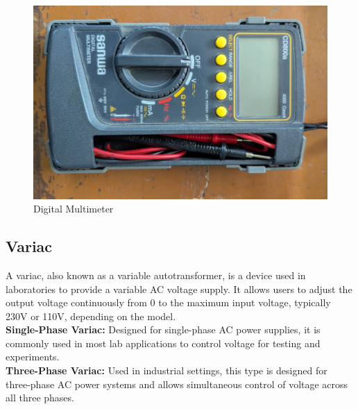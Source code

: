 \documentclass[a4paper,12pt]{article}
\begin{document}
	
	
\begin{figure}[H]
	\centering
	\includegraphics[angle=270,width=0.5\linewidth]{Images/4}
	\caption{Digital Multimeter}
	\label{fig:4}
\end{figure}
	
\subsection{Variac}
A variac, also known as a variable autotransformer, is a device used in laboratories to provide a variable AC voltage supply. It allows users to adjust the output voltage continuously from 0 to the maximum input voltage, typically 230V or 110V, depending on the model.\\
\textbf{Single-Phase Variac:} Designed for single-phase AC power supplies, it is commonly used in most lab applications to control voltage for testing and experiments.\\
\textbf{Three-Phase Variac:} Used in industrial settings, this type is designed for three-phase AC power systems and allows simultaneous control of voltage across all three phases.
\end{document}
